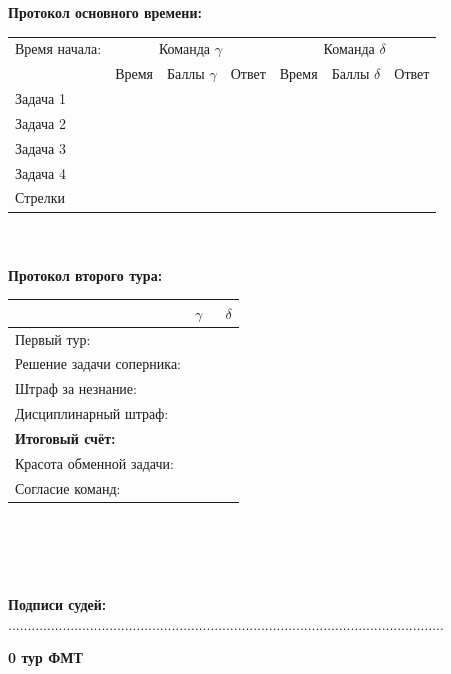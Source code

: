 \documentclass[12pt]{article}
\begin{document}
\begin{center}{\bf Протокол основного времени: } \\ 
\begin{tabular}{|p{3.3cm}|p{1.5cm}|p{2cm}|p{1.5cm}|p{1.5cm}|p{2cm}|p{1.5cm}|}
\hline Время начала: & \multicolumn{3}{c|}{Команда $\gamma$} & \multicolumn{3}{c|}{Команда $\delta$ }\\\cline{2-7} {} & Время & Баллы $\gamma$ & Ответ & Время & Баллы $\delta$ & Ответ \\\hline \hline \center Задача 1 &{}&{}&{}&{}&{}&{}\\[20mm]\hline \hline \center Задача 2 &{}&{}&{}&{}&{}&{}\\[20mm]\hline \hline \center Задача 3 &{}&{}&{}&{}&{}&{}\\[20mm]\hline \hline \center Задача 4 &{}&{}&{}&{}&{}&{}\\[20mm]\hline \hline \center Стрелки &{}&{}&{}&{}&{}&{}\\[20mm]\hline
\end{tabular}
$ $\\
$ $\\
{\bf Протокол второго тура: } \\ 
\begin{tabular}{ | p{7cm} | p{1cm} | p{1cm} |}
\hline
$ $ & \centering $\gamma$ & $\;$ $\delta$ \\ \hline\raggedleft Первый тур: & & \\ \hline\raggedleft Решение задачи соперника: & & \\ \hline\raggedleft Штраф за незнание: & & \\ \hline\raggedleft Дисциплинарный штраф: & & \\ \hline\raggedleft \bf Итоговый счёт: & & \\ \hline \hline\raggedleft Красота обменной задачи: & & \\ \hline\raggedleft Согласие команд: & & \\ \hline\end{tabular}\end{center}
$ $\\
$ $\\
$ $\\
$ $\\
{\bf Подписи судей: }................................................................................................................\newpage
\begin{center}
{\Huge \bf 0 тур ФМТ}
\end{center}
\end{document}
